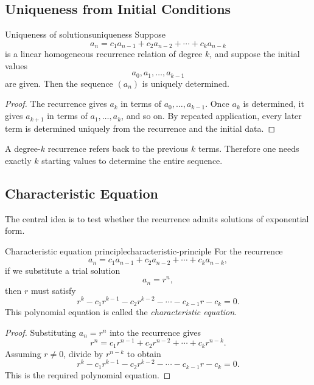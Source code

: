 \subsection{Uniqueness from Initial Conditions}

\begin{theorem}{Uniqueness of solutions}{uniqueness}
Suppose
\[
a_n=c_1a_{n-1}+c_2a_{n-2}+\cdots+c_ka_{n-k}
\]
is a linear homogeneous recurrence relation of degree $k$, and suppose the initial values
\[
a_0,a_1,\dots,a_{k-1}
\]
are given. Then the sequence $(a_n)$ is uniquely determined.
\end{theorem}

\begin{proof}
The recurrence gives $a_k$ in terms of $a_0,\dots,a_{k-1}$. Once $a_k$ is determined, it gives $a_{k+1}$ in terms of $a_1,\dots,a_k$, and so on. By repeated application, every later term is determined uniquely from the recurrence and the initial data.
\end{proof}

\begin{examtip}[title={Why the number of initial conditions equals the degree}]
A degree-$k$ recurrence refers back to the previous $k$ terms. Therefore one needs exactly $k$ starting values to determine the entire sequence.
\end{examtip}

\subsection{Characteristic Equation}

The central idea is to test whether the recurrence admits solutions of exponential form.

\begin{theorem}{Characteristic equation principle}{characteristic-principle}
For the recurrence
\[
a_n=c_1a_{n-1}+c_2a_{n-2}+\cdots+c_ka_{n-k},
\]
if we substitute a trial solution
\[
a_n=r^n,
\]
then $r$ must satisfy
\[
r^k-c_1r^{k-1}-c_2r^{k-2}-\cdots-c_{k-1}r-c_k=0.
\]
This polynomial equation is called the \emph{characteristic equation}.
\end{theorem}

\begin{proof}
Substituting $a_n=r^n$ into the recurrence gives
\[
r^n=c_1r^{n-1}+c_2r^{n-2}+\cdots+c_kr^{n-k}.
\]
Assuming $r\neq 0$, divide by $r^{n-k}$ to obtain
\[
r^k-c_1r^{k-1}-c_2r^{k-2}-\cdots-c_{k-1}r-c_k=0.
\]
This is the required polynomial equation.
\end{proof}

